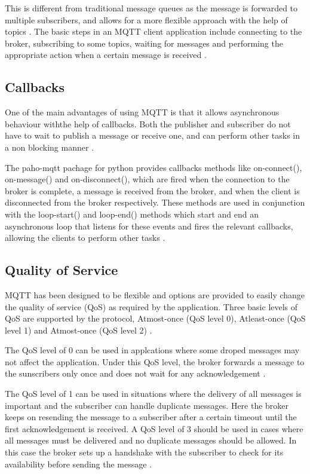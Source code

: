 \documentclass[sigconf]{acmart}
\begin{document}
This is different from traditional message queues as the message is
forwarded to multiple subscribers, and allows for a more flexible
approach with the help of topics \cite{hivemq-details}. The basic
steps in an MQTT client application include connecting to the broker,
subscribing to some topics, waiting for messages and performing the
appropriate action when a certain message is received
\cite{mqtt-wiki}.
 
\subsection{Callbacks}

One of the main advantages of using MQTT is that it allows
asynchronous behaviour withthe help of callbacks. Both the publisher
and subscriber do not have to wait to publish a message or receive
one, and can perform other tasks in a non blocking manner
\cite{hivemq-details} \cite{python-paho-mqtt}.

The paho-mqtt pachage for python provides callbacks methods like
on-connect(), on-message() and on-disconnect(), which are fired when
the connection to the broker is complete, a message is received from
the broker, and when the client is disconnected from the broker
respectively. These methods are used in conjunction with the
loop-start() and loop-end() methods which start and end an
asynchronous loop that listens for these events and fires the relevant
callbacks, allowing the clients to perform other tasks
\cite{python-paho-mqtt}.

\subsection{Quality of Service}

MQTT has been designed to be flexible and options are provided to
easily change the quality of service (QoS) as required by the
application. Three basic levels of QoS are supported by the protocol,
Atmost-once (QoS level 0), Atleast-once (QoS level 1) and Atmost-once
(QoS level 2) \cite{hivemq-qos}\cite{python-paho-mqtt}.

The QoS level of 0 can be used in applcations where some droped
messages may not affect the application. Under this QoS level, the
broker forwards a message to the sunscribers only once and does not
wait for any acknowledgement \cite{hivemq-qos}
\cite{python-paho-mqtt}.

The QoS level of 1 can be used in situations where the delivery of all
messages is important and the subscriber can handle duplicate
messages. Here the broker keeps on resending the message to a
subscriber after a certain timeout until the first acknowledgement is
received. A QoS level of 3 should be used in cases where all messages
must be delivered and no duplicate messages should be allowed. In this
case the broker sets up a handshake with the subscriber to check for
its availability before sending the message \cite{hivemq-qos}
\cite{python-paho-mqtt}.
\end{document}
